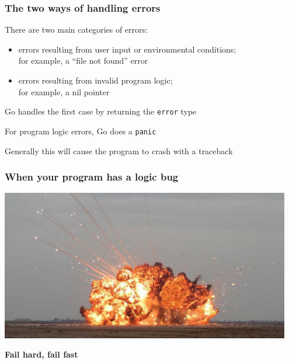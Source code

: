 \documentclass[handout,compress,t,11pt]{beamer}
\begin{document}
\begin{frame}[fragile]
    \frametitle{The two ways of handling errors}
    There are two main categories of errors:
    \begin{itemize}
        \item errors resulting from user input or environmental conditions; \\
        for example, a ``file not found'' error
        \vspace{0.4\baselineskip}
        \item errors resulting from invalid program logic; \\
        for example, a nil pointer
    \end{itemize}
    \vspace{2\baselineskip}
    Go handles the first case by returning the \verb|error| type \par
    \vspace{\baselineskip}
    For program logic errors, Go does a \verb|panic| \par
    \vspace{\baselineskip}
    Generally this will cause the program to crash with a traceback
\end{frame}

\begin{frame}[fragile]
    \frametitle{When your program has a logic bug}
\begin{center}
\vspace{0.4\baselineskip}
\includegraphics[width=0.95\textwidth]{fail-hard-fast.jpg} \par
\vspace{0.2\baselineskip}
{\bf Fail hard, fail fast}
\end{center}
\end{frame}
\end{document}

